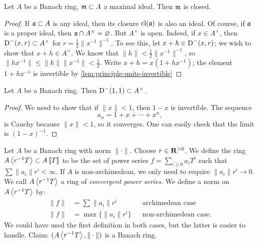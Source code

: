 \begin{lemma}\label{lem:maximal-ideal-closed}
Let $A$ be a Banach ring, $\mathfrak{m}\subset A$ a maximal ideal. Then $\mathfrak{m}$ is closed. 
\end{lemma}
\begin{proof}
If $\mathfrak{a}\subset A$ is any ideal, then its closure $\operatorname{cl}(\mathfrak{a})$ is also an 
ideal. Of course, if $\mathfrak{a}$ is a proper ideal, then 
$\mathfrak{a}\cap A^\times=\varnothing$. But $A^\times$ is open. Indeed, if 
$x\in A^\times$, then $\operatorname{D}^-(x,r)\subset A^\times$ for 
$r=\frac 1 2 \|x^{-1}\|^{-1}$. To see this, let $x+h\in \operatorname{D}^-(x,r)$; we wish 
to show that $x+h\in A^\times$. We know that $\|h\|<\frac 1 2 \|x^{-1}\|^{-1}$, 
so $\|h x^{-1}\| \leqslant \|h\| \|x^{-1}\| < \frac 1 2$. Write 
$x+h=x(1+h x^{-1})$; the element $1+h x^{-1}$ is invertible by 
\autoref{lem:principle-units-invertible}
\end{proof}

\begin{lemma}\label{lem:principle-units-invertible}
Let $A$ be a Banach ring. Then $\operatorname{D}^-(1,1)\subset A^\times$. 
\end{lemma}
\begin{proof}
We need to show that if $\|x\|<1$, then $1-x$ is invertible. The sequence 
\[
  a_n = 1 + x + \cdots + x^n ,
\]
is Cauchy because $\|x\|<1$, so it converges. One can easily check that the 
limit is $(1-x)^{-1}$. 
\end{proof}

\begin{example}\label{ex:Tate-algebra}
Let $A$ be a Banach ring with norm $\|\cdot\|$. Choose $r\in \mathbf{R}^{>0}$. We 
define the ring $A\left\langle r^{-1} T \right\rangle\subset A\left\llbracket T\right\rrbracket$ to be the set of power 
series $f=\sum_{i\geqslant 0} a_i T^i$ such that 
$\sum \|a_i\| r^i< \infty$. If $A$ is non-archimedean, we only need to require 
$\|a_i\| r^i \to 0$. We call $A\left\langle r^{-1} T \right\rangle$ a ring of \emph{convergent 
power series}. We define a norm on $A\left\langle r^{-1} T \right\rangle$ by: 
\begin{align*}
  \|f\| &= \sum \|a_i\| r^i && \text{archimedean case} \\
  \|f\| &= \max\{ \|a_i\| r^i\} && \text{non-archimedean case} .
\end{align*}
We could have used the first definition in both cases, but the latter is easier 
to handle. Claim: $(A\left\langle r^{-1} T \right\rangle,\|\cdot\|)$ is a Banach ring. 
\end{example}

